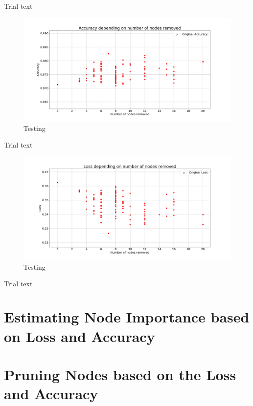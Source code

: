\documentclass[UKenglish]{ifimaster}
\begin{document}
            Trial text

            \begin{figure}[h!]\centering
                \includegraphics[width=\textwidth]{Accuracy_vs_nodes_removed_fmnist.png}
                \caption[Short title]{Testing}
                \label{fig:acc_rn_imp_fmnist}
            \end{figure}

            Trial text

            \begin{figure}[h!]\centering
                \includegraphics[width=\textwidth]{Loss_vs_nodes_removed_fmnist.png}
                \caption[Short title]{Testing}
                \label{fig:loss_rn_imp_fmnist}
            \end{figure}

            Trial text

    \section{Estimating Node Importance based on Loss and Accuracy}
    
    
    \section{Pruning Nodes based on the Loss and Accuracy}
\end{document}
